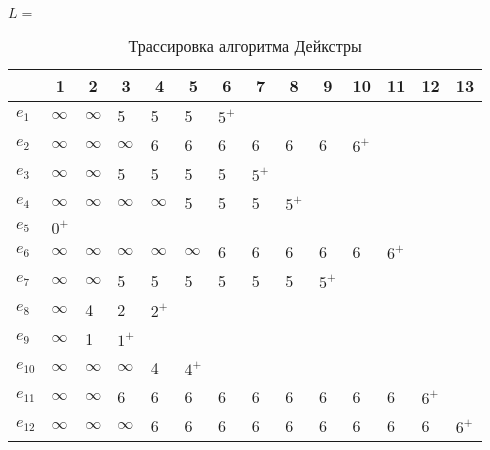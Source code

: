 \documentclass[a4paper,12pt]{article}
\begin{document}
\begin{table}[H]
    \centering
    \caption{Трассировка алгоритма Дейкстры}
    $L=$
    \begin{tabular}{l*{13}{|l}}
        &
        &
        &
        &
        &
        &
        &
        &
        &
        &
        &
        &
        &
        \\ \hline
        $e_{1}$&$\infty$&$\infty$&5&5&5&$5^+$&&&&&&&\\
        $e_{2}$&$\infty$&$\infty$&$\infty$&6&6&6&6&6&6&$6^+$&&&\\
        $e_{3}$&$\infty$&$\infty$&5&5&5&5&$5^+$&&&&&&\\
        $e_{4}$&$\infty$&$\infty$&$\infty$&$\infty$&5&5&5&$5^+$&&&&&\\
        \hline
        $e_{5}$&$0^+$&&&&&&&&&&&&\\
        $e_{6}$&$\infty$&$\infty$&$\infty$&$\infty$&$\infty$&6&6&6&6&6&$6^+$&&\\
        $e_{7}$&$\infty$&$\infty$&5&5&5&5&5&5&$5^+$&&&&\\
        $e_{8}$&$\infty$&4&2&$2^+$&&&&&&&&&\\
        \hline
        $e_{9}$&$\infty$&1&$1^+$&&&&&&&&&&\\
        $e_{10}$&$\infty$&$\infty$&$\infty$&4&$4^+$&&&&&&&&\\
        $e_{11}$&$\infty$&$\infty$&6&6&6&6&6&6&6&6&6&$6^+$&\\
        $e_{12}$&$\infty$&$\infty$&$\infty$&6&6&6&6&6&6&6&6&6&$6^+$\\
    \end{tabular}
\end{table}
\end{document}
